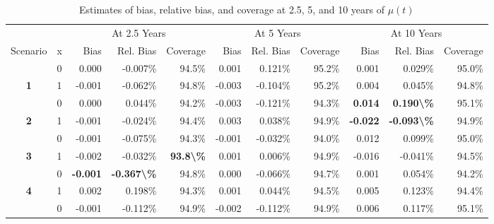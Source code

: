 \begin{table}

\caption{Estimates of bias, relative bias, and coverage at 2.5, 5, and 10 years of $\mu(t)$}
\centering
\begin{tabular}[t]{>{}ccrrrrrrrrr}
\toprule
\multicolumn{2}{c}{ } & \multicolumn{3}{c}{At 2.5 Years} & \multicolumn{3}{c}{At 5 Years} & \multicolumn{3}{c}{At 10 Years} \\
\cmidrule(l{3pt}r{3pt}){3-5} \cmidrule(l{3pt}r{3pt}){6-8} \cmidrule(l{3pt}r{3pt}){9-11}
Scenario & x & Bias & Rel. Bias & Coverage & Bias & Rel. Bias & Coverage & Bias & Rel. Bias & Coverage\\
\midrule
 & 0 & 0.000 & -0.007\% & 94.5\% & 0.001 & 0.121\% & 95.2\% & 0.001 & 0.029\% & 95.0\%\\

\multirow[t]{-2}{*}{\centering\arraybackslash \textbf{1}} & 1 & -0.001 & -0.062\% & 94.8\% & -0.003 & -0.104\% & 95.2\% & 0.004 & 0.045\% & 94.8\%\\

 & 0 & 0.000 & 0.044\% & 94.2\% & -0.003 & -0.121\% & 94.3\% & \textbf{ 0.014} & \textbf{ 0.190\textbackslash{}\%} & 95.1\%\\

\multirow[t]{-2}{*}{\centering\arraybackslash \textbf{2}} & 1 & -0.001 & -0.024\% & 94.4\% & 0.003 & 0.038\% & 94.9\% & \textbf{-0.022} & \textbf{-0.093\textbackslash{}\%} & 94.9\%\\

 & 0 & -0.001 & -0.075\% & 94.3\% & -0.001 & -0.032\% & 94.0\% & 0.012 & 0.099\% & 95.0\%\\

\multirow[t]{-2}{*}{\centering\arraybackslash \textbf{3}} & 1 & -0.002 & -0.032\% & \textbf{93.8\textbackslash{}\%} & 0.001 & 0.006\% & 94.9\% & -0.016 & -0.041\% & 94.5\%\\

\rule{0pt}{4ex}
 & 0 & \textbf{-0.001} & \textbf{-0.367\textbackslash{}\%} & 94.8\% & 0.000 & -0.066\% & 94.7\% & 0.001 & 0.054\% & 94.2\%\\

\multirow[t]{-2}{*}{\centering\arraybackslash \textbf{4}} & 1 & 0.002 & 0.198\% & 94.3\% & 0.001 & 0.044\% & 94.5\% & 0.005 & 0.123\% & 94.4\%\\

 & 0 & -0.001 & -0.112\% & 94.9\% & -0.002 & -0.112\% & 94.9\% & 0.006 & 0.117\% & 95.1\%\\


\end{tabular}
\end{table}
